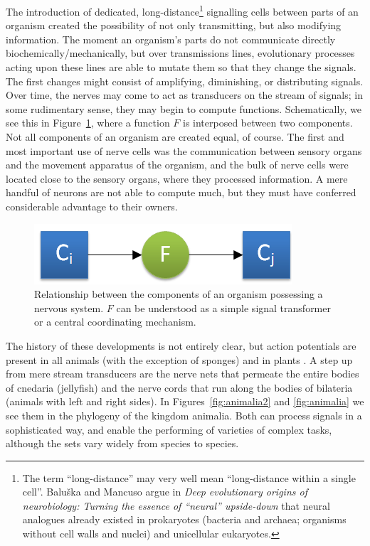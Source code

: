 The introduction of dedicated, long-distance\footnote{The term ``long-distance'' may very well mean ``long-distance within a single cell''. Balu\v{s}ka and Mancuso argue in {\em Deep evolutionary origins of neurobiology: Turning the essence of ``neural'' upside-down} \cite{frantisek} that neural analogues already existed in prokaryotes (bacteria and archaea; organisms without cell walls and nuclei) and unicellular eukaryotes.} signalling cells between parts of an organism created the possibility of not only transmitting, but also modifying information. The moment an organism's parts do not communicate directly biochemically/mechanically, but over transmissions lines, evolutionary processes acting upon these lines are able to mutate them so that they change the signals. The first changes might consist of amplifying, diminishing, or distributing signals. Over time, the nerves may come to act as transducers on the stream of signals; in some rudimentary sense, they may begin to compute functions. Schematically, we see this in Figure~\ref{fig:nervousSystem}, where a function $F$ is interposed between two components. Not all components of an organism are created equal, of course. The first and most important use of nerve cells was the communication between sensory organs and the movement apparatus of the organism, and the bulk of nerve cells were located close to the sensory organs, where they processed information. A mere handful of neurons are not able to compute much, but they must have conferred considerable advantage to their owners.

\begin{figure}
	\centering
	\includegraphics{Figs/nervousSystem.png}
	\caption{Relationship between the components of an organism possessing a nervous system. $F$ can be understood as a simple signal transformer or a central coordinating mechanism.}
	\label{fig:nervousSystem}
\end{figure}

The history of these developments is not entirely clear, but action potentials are present in all animals (with the exception of sponges) and in plants \cite{Leys01051999, PCE:PCE1614}. 
A step up from mere stream transducers are the nerve nets that permeate the entire bodies of cnedaria (jellyfish) and the nerve cords that run along the bodies of bilateria (animals with left and right sides). In Figures~\ref{fig:animalia2} and \ref{fig:animalia} we see them in the phylogeny of the kingdom animalia. Both can process signals in a sophisticated way, and enable the performing of varieties of complex tasks, although the sets vary widely from species to species.

